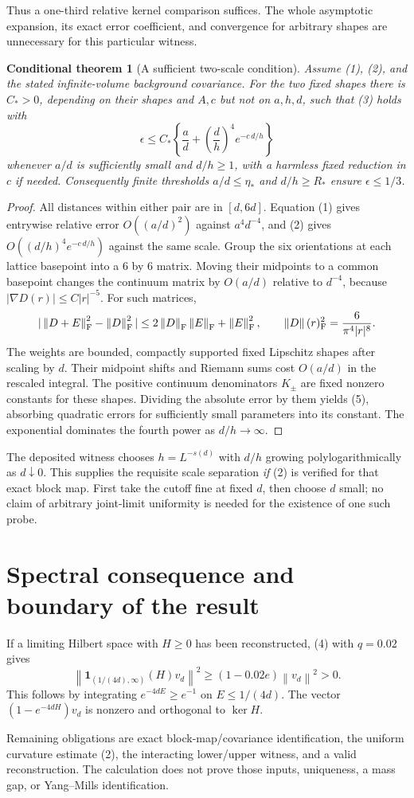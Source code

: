 \documentclass[11pt]{article}
\newtheorem{theorem}{Conditional theorem}
\newcommand{\norm}[1]{\left\|#1\right\|}
\begin{document}
Thus a one-third relative kernel comparison suffices. The whole
asymptotic expansion, its exact error coefficient, and convergence
for arbitrary shapes are unnecessary for this particular witness.

\begin{theorem}[A sufficient two-scale condition]
Assume (1), (2), and the stated infinite-volume background covariance.
For the two fixed shapes there is $C_*>0$, depending on their shapes
and $A,c$ but not on $a,h,d$, such that (3) holds with
\[
\epsilon\leq C_*\left\{\frac ad+
\left(\frac dh\right)^4e^{-c\,d/h}\right\}
\tag{5}
\]
whenever $a/d$ is sufficiently small and $d/h\geq1$, with a harmless
fixed reduction in $c$ if needed.
Consequently finite thresholds $a/d\leq\eta_*$ and $d/h\geq R_*$
ensure $\epsilon\leq1/3$.
\end{theorem}
\begin{proof}
All distances within either pair are in $[d,6d]$.
Equation (1) gives entrywise relative error $O((a/d)^2)$ against
$a^4d^{-4}$, and (2) gives
$O((d/h)^4e^{-c\,d/h})$ against the same scale.
Group the six orientations at each lattice basepoint into a $6$ by $6$
matrix. Moving their midpoints to a common basepoint changes the
continuum matrix by $O(a/d)$ relative to $d^{-4}$, because
$|\nabla D(r)|\leq C|r|^{-5}$.
For such matrices,
\[
|\norm{D+E}_{\rm F}^2-\norm D_{\rm F}^2|
\leq2\norm D_{\rm F}\norm E_{\rm F}+\norm E_{\rm F}^2,
\qquad
\norm D(r)_{\rm F}^2=\frac6{\pi^4|r|^8}.
\]
The weights are bounded, compactly supported fixed Lipschitz shapes
after scaling by $d$. Their midpoint shifts and Riemann sums cost
$O(a/d)$ in the rescaled integral. The positive continuum denominators
$K_\pm$ are fixed nonzero constants for these shapes.
Dividing the absolute error by them yields (5), absorbing quadratic
errors for sufficiently small parameters into its constant.
The exponential dominates the fourth power as $d/h\to\infty$.
\end{proof}

The deposited witness chooses $h=L^{-s(d)}$ with
$d/h$ growing polylogarithmically as $d\downarrow0$.
This supplies the requisite scale separation \emph{if} (2) is verified
for that exact block map. First take the cutoff fine at fixed $d$,
then choose $d$ small; no claim of arbitrary joint-limit uniformity is
needed for the existence of one such probe.

\section{Spectral consequence and boundary of the result}

If a limiting Hilbert space with $H\geq0$ has been reconstructed,
(4) with $q=0.02$ gives
\[
\norm{\mathbf1_{(1/(4d),\infty)}(H)v_d}^2
\geq(1-0.02e)\norm{v_d}^2>0.
\]
This follows by integrating $e^{-4dE}\geq e^{-1}$ on
$E\leq1/(4d)$. The vector $(1-e^{-4dH})v_d$ is nonzero and
orthogonal to $\ker H$.

Remaining obligations are exact block-map/covariance identification,
the uniform curvature estimate (2), the interacting lower/upper
witness, and a valid reconstruction. The calculation does not prove
those inputs, uniqueness, a mass gap, or Yang--Mills identification.
\end{document}
